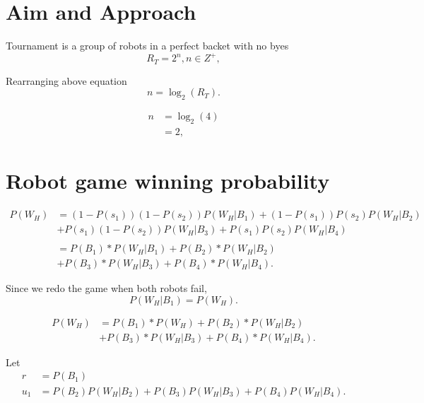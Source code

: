 \documentclass[11pt]{article}
\begin{document}
\section{Aim and Approach}

Tournament is a group of robots in a perfect backet with no byes
\begin{equation*}
    R_T = 2^n, n \in Z^+,
\end{equation*}

Rearranging above equation
\begin{equation*}
    n = \log_2(R_T).
\end{equation*}

\begin{align*}
    n &= \log_2(4)\\
    &= 2,
\end{align*}


\section{Robot game winning probability}


\begin{align*}
    P(W_{H})&= (1-P(s_1))(1-P(s_2))P(W_H | B_1) + (1-P(s_1))P(s_2)P(W_H | B_2)\\
    &+ P(s_1)(1-P(s_2))P(W_H | B_3) + P(s_1)P(s_2)P(W_H | B_4)\\
    \\
    &= P(B_{1}) * P(W_{H} | B_{1}) + P(B_{2}) * P(W_{H} | B_{2}) \\
    &+ P(B_{3}) * P(W_{H} | B_{3}) + P(B_{4}) * P(W_{H} | B_{4}).
\end{align*}

Since we redo the game when both robots fail,
\begin{equation*}
    P(W_H | B_1) = P(W_{H}).
\end{equation*} 

\begin{align*}
    P(W_H) &= P(B_{1}) * P(W_{H}) + P(B_{2}) * P(W_{H} | B_{2})\\
    &+ P(B_{3}) * P(W_{H} | B_{3}) + P(B_{4}) * P(W_{H} | B_{4}).
\end{align*}

Let
\begin{align*}
    r &= P(B_1)\\
    u_1 &= P(B_2)P(W_H | B_2) + P(B_3)P(W_H | B_3) + P(B_4)P(W_H | B_4).
\end{align*}
\end{document}
